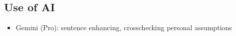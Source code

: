 \FloatBarrier

\clearpage

\subsection*{Use of AI}

\begin{itemize}
    \item Gemini (Pro): sentence enhancing, crosschecking personal assumptions
\end{itemize}




